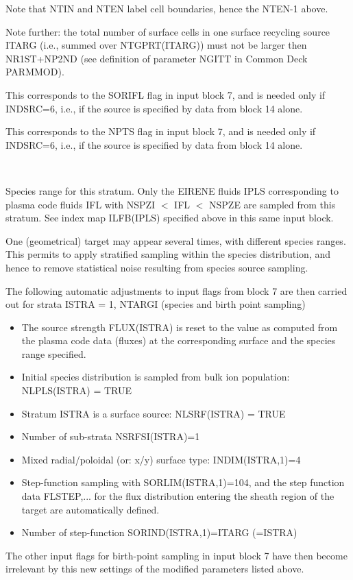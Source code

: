 \begin{list}{ }{}
Note that NTIN and NTEN label cell boundaries, hence the NTEN-1 above.

Note further: the total number of surface cells in one surface recycling
source ITARG (i.e., summed over NTGPRT(ITARG)) must not be larger then
NR1ST+NP2ND  (see definition of parameter NGITT in Common Deck PARMMOD).
\item[{\bf NIFLG }]
This corresponds to the SORIFL flag in input block 7, and is needed only
if INDSRC=6, i.e., if the source is specified by data from block 14
alone.
\item[{\bf NPTC }]
This corresponds to the NPTS flag in input block 7, and is needed
only if INDSRC=6, i.e., if the source is specified by data from block 14
alone.
\item[{\bf NSPZI,NSPZE }] ~

Species range for this stratum. Only the EIRENE fluids IPLS
corresponding to plasma code fluids IFL with  NSPZI $<$ IFL $<$ NSPZE
are sampled from this stratum. See index map ILFB(IPLS) specified above
in this same input block.

One (geometrical) target may
appear several times, with different species ranges. This permits
to apply stratified sampling within the species distribution, and hence
to remove statistical noise resulting from species source sampling.
\end{list}

The following automatic adjustments to input flags from block 7
are then
carried out for strata ISTRA = 1, NTARGI (species and birth point sampling)
\begin{itemize}
\item The source strength FLUX(ISTRA) is reset to the value as
computed from the plasma code data (fluxes) at the corresponding
surface and the species range specified.
\item Initial species distribution is sampled from bulk ion population:
NLPLS(ISTRA) = TRUE
\item Stratum ISTRA is a surface source:
NLSRF(ISTRA) = TRUE
\item Number of sub-strata NSRFSI(ISTRA)=1
\item Mixed radial/poloidal (or: x/y) surface type: INDIM(ISTRA,1)=4
\item Step-function sampling with SORLIM(ISTRA,1)=104, and the step
function data FLSTEP,...
for the flux distribution entering the sheath region of the target are
automatically defined.
\item Number of step-function  SORIND(ISTRA,1)=ITARG (=ISTRA)
\end{itemize}
The other input flags for birth-point sampling in input block 7 have then become irrelevant
by this new settings of the modified parameters listed above.

